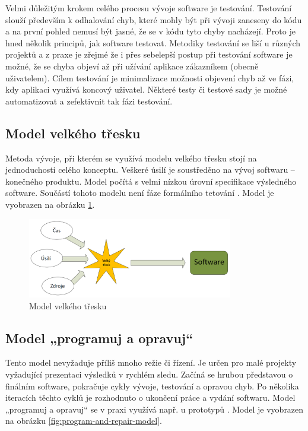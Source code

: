 Velmi důležitým krokem celého procesu vývoje software je testování. Testování slouží především k odhalování chyb, které mohly být při vývoji zaneseny do kódu a na první pohled nemusí být jasné, že se v kódu tyto chyby nacházejí. Proto je hned několik principů, jak software testovat. Metodiky testování se liší u různých projektů a z praxe je zřejmé že i přes sebelepší postup při testování software je možné, že se chyba objeví až při užívání aplikace zákazníkem (obecně uživatelem). Cílem testování je minimalizace možnosti objevení chyb až ve fázi, kdy aplikaci využívá koncový uživatel. Některé testy či testové sady je možné automatizovat a zefektivnit tak fázi testování.

\subsection{Model velkého třesku}
Metoda vývoje, při kterém se využívá modelu velkého třesku stojí na jednoduchosti celého konceptu. Veškeré úsilí je soustředěno na vývoj softwaru – konečného produktu. Model počítá s velmi nízkou úrovní specifikace výsledného software. Součástí tohoto modelu není fáze formálního tetování \cite{Patton2002}. Model je vyobrazen na obrázku \ref{fig:big-bang-model}.


\begin{figure}[!h]
	\centering
	\includegraphics[width=0.8\textwidth]{Figures/velky-tresk.png}
	\caption{Model velkého třesku}
	\label{fig:big-bang-model}
\end{figure}

\subsection{Model „programuj a opravuj“}
Tento model nevyžaduje příliš mnoho režie či řízení. Je určen pro malé projekty vyžadující prezentaci výsledků v rychlém sledu. Začíná se hrubou představou o finálním software, pokračuje cykly vývoje, testování a opravou chyb. Po několika iteracích těchto cyklů je rozhodnuto o ukončení práce a vydání softwaru. Model „programuj a opravuj“ se v praxi využívá např. u prototypů \cite{Patton2002}. Model je vyobrazen na obrázku \ref{fig:program-and-repair-model}.


